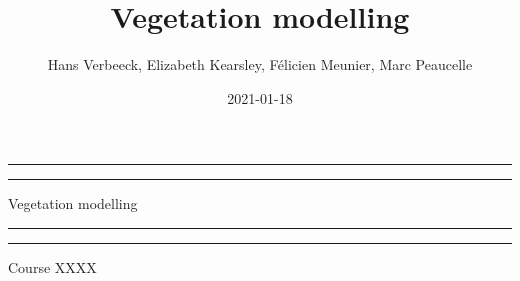 \documentclass[oneside]{book}
\title{Vegetation modelling}
\author{Hans Verbeeck, Elizabeth Kearsley, Félicien Meunier, Marc Peaucelle}
\date{2021-01-18}
\begin{document}
\maketitle

\newcommand{\plogo}{\fbox{$\mathcal{PL}$}} %
\frontmatter


\begin{titlepage} %

	\centering %
	
	\scshape %
	
	\vspace*{\baselineskip} %
	
	
	\vspace{12\baselineskip}
	
	\rule{\textwidth}{1.6pt}\vspace*{-\baselineskip}\vspace*{2pt} %
	\rule{\textwidth}{0.4pt} %
	
	\vspace{0.75\baselineskip} %
	
	{\LARGE Vegetation modelling\\} %
	
	\vspace{0.75\baselineskip} %
	
	\rule{\textwidth}{0.4pt}\vspace*{-\baselineskip}\vspace{3.2pt} %
	\rule{\textwidth}{1.6pt} %
	
	\vspace{2\baselineskip} %
	
	
	Course XXXX %
	
	\vspace*{3\baselineskip} %
	
	

\end{titlepage}
\end{document}
